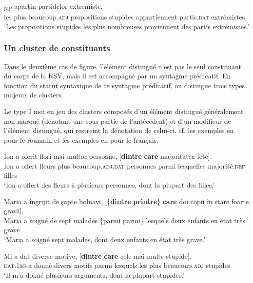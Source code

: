 \ex {} 
\textsubscript{NP}  aparțin  partidelor extremiste. \label{ch3:ex30b}\\
les  plus  beaucoup.\textsc{adj}  propositions  stupides  appartiennent partis.\textsc{dat} extrémistes\\
\glt ‘Les propositions stupides les plus nombreuses proviennent des partis extrémistes.’
\z 
\z 


\subsubsection{Un  {cluster} de constituants}\label{ch3:sect3.2.2.2}

Dans le deuxième cas de figure, l’élément distingué n’est pas le seul constituant du corps de la RSV, mais il est accompagné par un syntagme prédicatif. En fonction du statut syntaxique de ce syntagme prédicatif, on distingue trois types majeurs de clusters.

Le type I met en jeu des clusters composés d’un élément distingué généralement non marqué (dénotant une sous-partie de l’antécédent) et d’un modifieur de l’élément distingué, qui restreint la dénotation de celui-ci, cf. les exemples en  pour le roumain et les exemples en  pour le français. 

\ea \label{ch3:ex31}
\ea
\gll Ion  a  oferit  flori  mai  multor  persoane,  [\textbf{dintre} \textbf{care} majoritatea  fete]. \label{ch3:ex31a}\\
Ion  a  offert  fleurs  plus  beaucoup.\textsc{adj.dat}  personnes  parmi  lesquelles majorité.\textsc{def}  filles \\
\glt ‘Ion a offert des fleurs à plusieurs personnes, dont la plupart des filles.’

\ex 
\gll Maria  a  îngrijit  de  şapte  bolnavi,  [\{\textbf{dintre}  {\textbar}  \textbf{printre}\}  \textbf{care}  doi  copii în  stare  foarte  gravă]. \label{ch3:ex31b}\\
Maria  a  soigné  de  sept  malades  \{parmi  {\textbar}  parmi\}  lesquels  deux  enfants en  état  très  grave \\
\glt ‘Maria a soigné sept malades, dont deux enfants en état très grave.’

\ex 
\gll Mi-a dat diverse motive, [\textbf{dintre} \textbf{care} cele mai multe stupide]. \label{ch3:ex31c}\\
 \textsc{dat.1sg}{}-a  donné  divers  motifs  parmi  lesquels  les  plus  beaucoup.\textsc{adj} stupides\\
\glt ‘Il m’a donné plusieurs arguments, dont la plupart stupides.’
\z 
\z 

